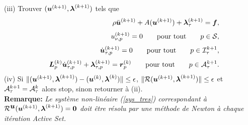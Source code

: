 \qquad(iii) Trouver $(\mbox{\boldmath{$u$}}^{(k+1) },\mbox{\boldmath{$\lambda$}}^{(k+1) })$ tels que
\begin{eqnarray}
&& \label{sys_tres} \rho\ddot{\mbox{\boldmath{$u$}}}^{(k+1)} + A(\mbox{\boldmath{$u$}}^{(k+1)}) + \mbox{\boldmath{$\lambda$}}_{\tau}^{(k+1)}= \mbox{\boldmath{$f$}},\\[1mm]
&& u^{(k+1)}_{\nu,p}=0 \qquad {\rm pour \ tout} \qquad p\in {\cal S}\nonumber,\\[1mm]
&&\dot{\mbox{\boldmath{$u$}}}^{(k+1)}_{\tau,p}=0 \qquad {\rm pour \ tout} \qquad p\in {\cal I}^{k+1}_\tau,\nonumber\\[1mm]
&&\mbox{\boldmath{$L$}}_p^{(k)}\dot{\mbox{\boldmath{$u$}}}_{\tau, p}^{(k+1)}+ \mbox{\boldmath{$\lambda$}}_{\tau, p}^{(k+1)}= \mbox{\boldmath{$r$}}_p^{(k)} \qquad {\rm pour \ tout} \qquad p\in {\cal A}^{k+1}_\tau.\nonumber
\end{eqnarray}
\noindent
\qquad(iv) Si $\|(\mbox{\boldmath{$u$}}^{(k+1) },\mbox{\boldmath{$\lambda$}}^{(k+1)})-(\mbox{\boldmath{$u$}}^{(k) },\mbox{\boldmath{$\lambda$}}^{(k)})\|\leq\epsilon$, $\|{\cal R}(\mbox{\boldmath{$u$}}^{(k+1) },\mbox{\boldmath{$\lambda$}}^{(k+1)})\|\leq\epsilon$ et ${\cal A}^{k+1}_\tau={\cal A}^{k}_\tau$ alors stop, sinon retourner à (ii).\\

{\bf Remarque:} \textit{Le système non-linéaire (\ref{sys_tres}) correspondant à ${\cal R}^{\mbox{\boldmath{$u$}}}(\mbox{\boldmath{$u$}}^{(k+1)},\mbox{\boldmath{$\lambda$}}^{(k+1)})=\mbox{\boldmath{$0$}}$ doit être résolu par une méthode de Newton à chaque itération Active Set.}\\

\noindent {}\\

